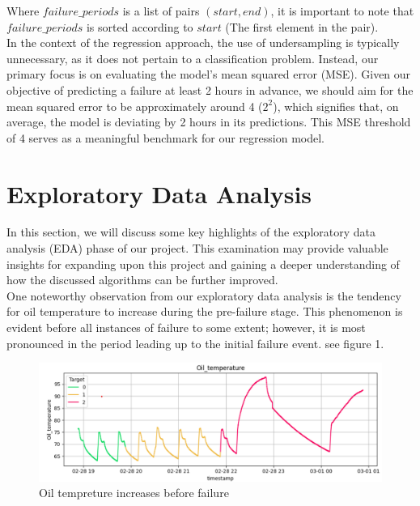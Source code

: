 \documentclass{article}
\begin{document}
Where $failure\_periods$ is a list of pairs $(start, end)$, it is important to note that $failure\_periods$ is sorted according to $start$ (The first element in the pair). \\

In the context of the regression approach, the use of undersampling is typically unnecessary, as it does not pertain to a classification problem. Instead, our primary focus is on evaluating the model's mean squared error (MSE). Given our objective of predicting a failure at least 2 hours in advance, we should aim for the mean squared error to be approximately around 4 ($2^2$), which signifies that, on average, the model is deviating by 2 hours in its predictions. This MSE threshold of 4 serves as a meaningful benchmark for our regression model.

\newpage

\section{Exploratory Data Analysis}

In this section, we will discuss some key highlights of the exploratory data analysis (EDA) phase of our project. This examination may provide valuable insights for expanding upon this project and gaining a deeper understanding of how the discussed algorithms can be further improved.\\

One noteworthy observation from our exploratory data analysis is the tendency for oil temperature to increase during the pre-failure stage. This phenomenon is evident before all instances of failure to some extent; however, it is most pronounced in the period leading up to the initial failure event. see figure 1.\\

\begin{figure}
    \centering
    \includegraphics[width=1\textwidth]{EDA_oil.png}
    \caption{Oil tempreture increases before failure}
    \label{fig:Oil temp}
\end{figure}
\end{document}
